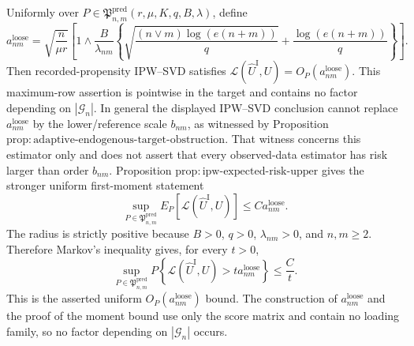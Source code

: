 Uniformly over \(P\in\mathfrak P^{\mathrm{pred}}_{n,m}(r,\mu,K,q,B,\lambda)\), define
\[
 a^{\mathrm{loose}}_{nm}=
 \sqrt{\frac n{\mu r}}\left[1\wedge
 \frac B{\lambda_{nm}}\left\{
 \sqrt{\frac{(n\vee m)\log(e(n+m))}{q}}+
 \frac{\log(e(n+m))}{q}\right\}\right].
\]
Then recorded-propensity IPW--SVD satisfies
\(\mathcal L(\widehat U^{\mathrm I},U)=O_P(a^{\mathrm{loose}}_{nm})\).  This maximum-row assertion is pointwise in the target and contains no factor depending on \(|\mathcal G_n|\).  In general the displayed IPW--SVD conclusion cannot replace \(a^{\mathrm{loose}}_{nm}\) by the lower/reference scale \(b_{nm}\), as witnessed by Proposition \(\mathrm{prop:adaptive\mbox{-}endogenous\mbox{-}target\mbox{-}obstruction}\).  That witness concerns this estimator only and does not assert that every observed-data estimator has risk larger than order \(b_{nm}\).
Proposition \(\mathrm{prop:ipw\mbox{-}expected\mbox{-}risk\mbox{-}upper}\) gives the stronger uniform first-moment statement
\[
 \sup_{P\in\mathfrak P^{\mathrm{pred}}_{n,m}}
 E_P\!\left[\mathcal L(\widehat U^{\mathrm I},U)\right]
 \le C a^{\mathrm{loose}}_{nm}.
\]
The radius is strictly positive because \(B>0\), \(q>0\), \(\lambda_{nm}>0\), and \(n,m\ge2\).  Therefore Markov's inequality gives, for every \(t>0\),
\[
 \sup_{P\in\mathfrak P^{\mathrm{pred}}_{n,m}}
 P\!\left\{\mathcal L(\widehat U^{\mathrm I},U)>
 t a^{\mathrm{loose}}_{nm}\right\}\le \frac Ct.
\]
This is the asserted uniform \(O_P(a^{\mathrm{loose}}_{nm})\) bound.  The construction of \(a^{\mathrm{loose}}_{nm}\) and the proof of the moment bound use only the score matrix and contain no loading family, so no factor depending on \(|\mathcal G_n|\) occurs.

